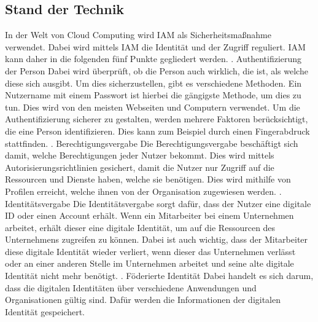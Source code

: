 \subsection{Stand der Technik}
\label{sec:chapter04:Stand}
In der Welt von Cloud Computing wird \ac{IAM} als Sicherheitsmaßnahme verwendet.
Dabei wird mittels \ac{IAM} die Identität und der Zugriff reguliert.
\ac{IAM} kann daher in die folgenden fünf Punkte gegliedert werden.
\newline
{}. Authentifizierung der Person
\newline
Dabei wird überprüft, ob die Person auch wirklich, die ist, als welche diese sich ausgibt.
Um dies sicherzustellen, gibt es verschiedene Methoden.
Ein Nutzername mit einem Passwort ist hierbei die gängigste Methode, um dies zu tun. Dies wird von den meisten Webseiten und Computern verwendet.
Um die Authentifizierung sicherer zu gestalten, werden mehrere Faktoren berücksichtigt, die eine Person identifizieren.
Dies kann zum Beispiel durch einen Fingerabdruck stattfinden. \cite[1482]{IamIEEE} 
\newline
{}. Berechtigungsvergabe
\newline
Die Berechtigungsvergabe beschäftigt sich damit, welche Berechtigungen jeder Nutzer bekommt.
Dies wird mittels Autorisierungsrichtlinien gesichert, damit die Nutzer nur Zugriff auf die Ressourcen und Dienste haben, welche sie benötigen.
Dies wird mithilfe von Profilen erreicht, welche ihnen von der Organisation zugewiesen werden. \cite[1482]{IamIEEE} 
\newline
{}. Identitätsvergabe
\newline
Die Identitätsvergabe sorgt dafür, dass der Nutzer eine digitale ID oder einen Account erhält.
Wenn ein Mitarbeiter bei einem Unternehmen arbeitet, erhält dieser eine digitale Identität, um auf die Ressourcen des Unternehmens zugreifen zu können.
Dabei ist auch wichtig, dass der Mitarbeiter diese digitale Identität wieder verliert, wenn dieser das Unternehmen verlässt oder an einer anderen Stelle im Unternehmen arbeitet und seine alte digitale Identität nicht mehr benötigt. \cite[1482]{IamIEEE}
\newline
{}. Föderierte Identität
\newline
Dabei handelt es sich darum, dass die digitalen Identitäten über verschiedene Anwendungen und Organisationen gültig sind.
Dafür werden die Informationen der digitalen Identität gespeichert.
